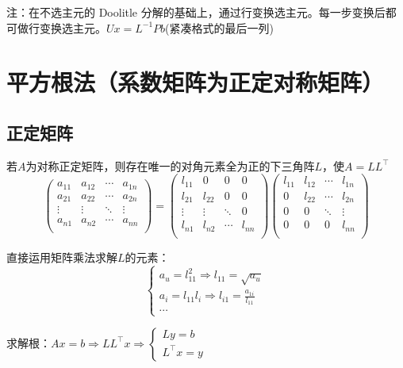\documentclass[UTF8,a4paper,11pt,oneside]{ctexbook}
\begin{document}
注：在不选主元的 Doolitle 分解的基础上，通过行变换选主元。每一步变换后都可做行变换选主元。\(Ux=L^{-1}Pb\)(紧凑格式的最后一列)

\section{平方根法（系数矩阵为正定对称矩阵）}

\subsection{正定矩阵}

若\(A\)为对称正定矩阵，则存在唯一的对角元素全为正的下三角阵\(L\)，使\(A=LL^\top\)
\[
\begin{pmatrix}
    a_{11} & a_{12} & \cdots & a_{1n}\\
    a_{21} & a_{22} & \cdots & a_{2n}\\
    \vdots & \vdots & \ddots & \vdots\\
    a_{n1} & a_{n2} & \cdots & a_{nn}\\
\end{pmatrix}
=
\begin{pmatrix}
    l_{11} & 0 & 0 & 0\\
    l_{21} & l_{22} & 0 & 0\\
    \vdots & \vdots & \ddots & 0\\
    l_{n1} & l_{n2} & \cdots & l_{nn}\\
\end{pmatrix}
\begin{pmatrix}
    l_{11} & l_{12} & \cdots & l_{1n}\\
    0 & l_{22} & \cdots & l_{2n}\\
    0 & 0 & \ddots & \vdots\\
    0 & 0 & 0 &l_{nn}\\
\end{pmatrix}
\]

直接运用矩阵乘法求解\(L\)的元素：
\[
\begin{cases}
    a_u=l_{11}^2\Rightarrow l_{11}=\sqrt{a_u}\\
    a_i=l_{11}l_{i}\Rightarrow l_{i1}=\frac{a_{1i}}{l_{11}}\\
    \cdots
\end{cases}
\]

求解根：\(Ax=b\Rightarrow LL^\top x\Rightarrow\begin{cases}
    Ly=b\\
    L^\top x=y
\end{cases}\)
\end{document}
